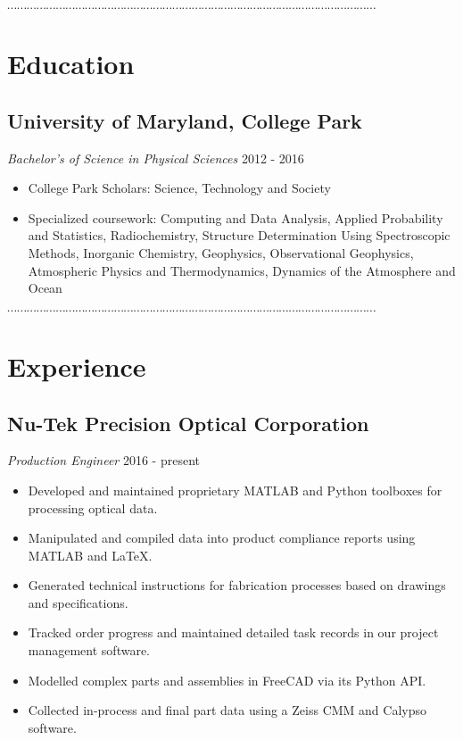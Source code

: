\documentclass[10pt]{article}
\newcommand{\dotfringe}{
    \begin{center}
      $\cdots\cdots\cdots\cdots\cdots\cdots\cdots\cdots\cdots\cdots\cdots\cdots\cdots\cdots\cdots\cdots\cdots\cdots\cdots\cdots\cdots\cdots\cdots\cdots\cdots\cdots\cdots\cdots\cdots\cdots\cdots\cdots\cdots\cdots\cdots\cdots\cdots\cdots$
    \end{center}
}
\begin{document}

\dotfringe

\section*{Education}
\subsection*{University of Maryland, College Park}
\textit{Bachelor's of Science in Physical Sciences} \hfill 2012 - 2016
\begin{itemize}
  \item College Park Scholars: Science, Technology and Society
  \item Specialized coursework: Computing and Data Analysis, Applied Probability and Statistics, Radiochemistry, Structure Determination Using Spectroscopic Methods, Inorganic Chemistry, Geophysics, Observational Geophysics, Atmospheric Physics and Thermodynamics, Dynamics of the Atmosphere and Ocean
\end{itemize}

\dotfringe

\section*{Experience}
\subsection*{Nu-Tek Precision Optical Corporation}
\textit{Production Engineer} \hfill 2016 - present
\begin{itemize}
  \item Developed and maintained proprietary MATLAB and Python toolboxes for processing optical data.
  \item Manipulated and compiled data into product compliance reports using MATLAB and \LaTeX.
  \item Generated technical instructions for fabrication processes based on drawings and specifications.
  \item Tracked order progress and maintained detailed task records in our project management software.
  \item Modelled complex parts and assemblies in FreeCAD via its Python API.
  \item Collected in-process and final part data using a Zeiss CMM and Calypso software.
\end{itemize}
\end{document}
